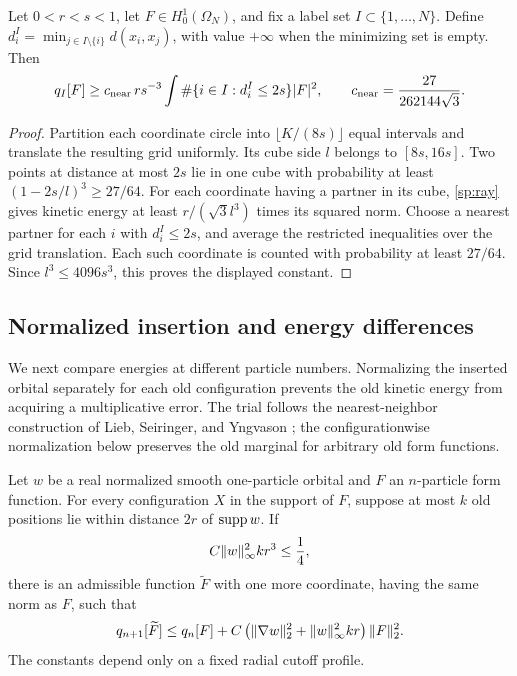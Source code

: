 \begin{lemma}\label{sp:close-energy}
Let $0<r<s<1$, let $F\in H_0^1(\Omega_N)$, and fix a label set
$I\subset\{1,\ldots,N\}$.  Define
$d_i^I=\min_{j\in I\setminus\{i\}}d(x_i,x_j)$, with value $+\infty$
when the minimizing set is empty.  Then
\begin{equation}\label{sp:close-energy-bound}
 q_I[F]\ge c_{\rm near}\,rs^{-3}
        \int\#\{i\in I:d_i^I\le2s\}|F|^2,
 \qquad c_{\rm near}=\frac{27}{262144\sqrt3}.
\end{equation}
\end{lemma}

\begin{proof}
Partition each coordinate circle into $\lfloor K/(8s)\rfloor$ equal
intervals and translate the resulting grid uniformly.  Its cube side
$l$ belongs to $[8s,16s]$.  Two points at distance at most $2s$ lie in
one cube with probability at least $(1-2s/l)^3\ge27/64$.
For each coordinate having a partner in its cube, \eqref{sp:ray}
gives kinetic energy at least $r/(\sqrt3l^3)$ times its squared norm.
Choose a nearest partner for each $i$ with $d_i^I\le2s$, and average
the restricted inequalities over the grid translation.  Each such
coordinate is counted with probability at least $27/64$.  Since
$l^3\le4096s^3$, this proves the displayed constant.
\end{proof}

\subsection{Normalized insertion and energy differences}

We next compare energies at different particle numbers.  Normalizing the
inserted orbital separately for each old configuration prevents the old
kinetic energy from acquiring a multiplicative error. The trial follows the
nearest-neighbor construction of Lieb, Seiringer, and Yngvason
\cite[Section~3.2]{LiebSeiringerYngvason2000}; the configurationwise
normalization below preserves the old marginal for arbitrary old form
functions.

\begin{lemma}\label{sp:insertion}
Let $w$ be a real normalized smooth one-particle orbital and $F$ an
$n$-particle form function.  For every configuration $X$ in the support
of $F$, suppose at most $k$ old positions lie within distance $2r$ of
$\operatorname{supp} w$.  If
\begin{equation}\label{sp:insertion-smallness}
 C\lVert w\rVert_\infty^2kr^3\le\frac14,
\end{equation}
there is an admissible function $\widetilde F$ with one more coordinate,
having the same norm as $F$, such that
\begin{equation}\label{sp:insertion-cost}
 q_{n+1}[\widetilde F]\le q_n[F]
       +C\left(\lVert\nabla w\rVert_2^2+\lVert w\rVert_\infty^2kr\right)\lVert F\rVert_2^2.
\end{equation}
The constants depend only on a fixed radial cutoff profile.
\end{lemma}


